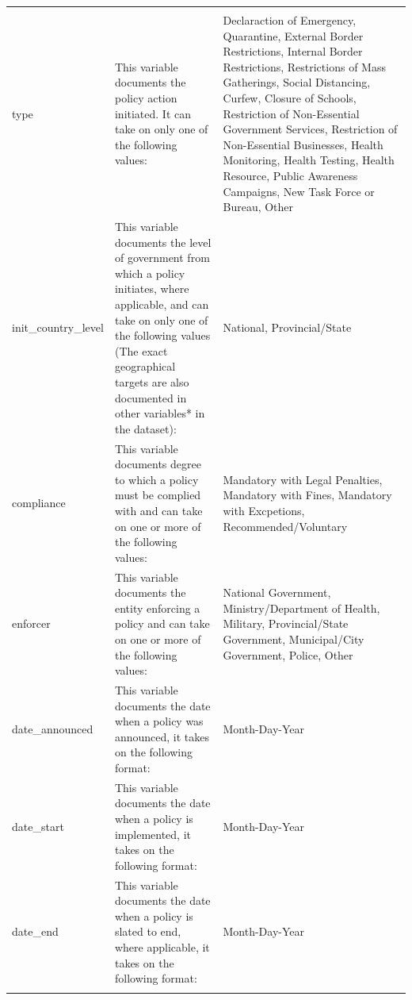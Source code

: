 \documentclass[]{article}
\begin{document}
\begin{ThreePartTable}
\begin{longtable}{>{\bfseries\raggedright\arraybackslash}p{3.5cm}>{\raggedright\arraybackslash}p{5cm}>{\raggedright\arraybackslash}p{8.5cm}}
\addlinespace[0.3em]
\multicolumn{3}{l}{\textbf{Monadic Variables}}\\
\hspace{1em}type & This variable documents the policy action initiated. It can take on only one of the following values: & Declaraction of Emergency, Quarantine, External Border Restrictions, Internal Border Restrictions, Restrictions of Mass Gatherings, Social Distancing, Curfew, Closure of Schools, Restriction of Non-Essential Government Services, Restriction of Non-Essential Businesses, Health Monitoring, Health Testing, Health Resource, Public Awareness Campaigns, New Task Force or Bureau, Other\\
\rowcolor{gray!6}  \hspace{1em}init\_country\_level & This variable documents the level of government from which a policy initiates, where applicable, and can take on only one of the following values  (The exact geographical targets are also documented in other variables* in the dataset): & National, Provincial/State\\
\hspace{1em}compliance & This variable documents degree to which a policy must be complied with and can take on one or more of the following values: & Mandatory with Legal Penalties, Mandatory with Fines, Mandatory with Excpetions, Recommended/Voluntary\\
\rowcolor{gray!6}  \hspace{1em}enforcer & This variable documents the entity enforcing a policy and can take on one or more of the following values: & National Government, Ministry/Department of Health, Military, Provincial/State Government, Municipal/City Government, Police, Other\\
\hspace{1em}date\_announced & This variable documents the date when a policy was announced, it takes on the following format: & Month-Day-Year\\
\rowcolor{gray!6}  \hspace{1em}date\_start & This variable documents the date when a policy is implemented, it takes on the following format: & Month-Day-Year\\
\hspace{1em}date\_end & This variable documents the date when a policy is slated to end, where applicable, it takes on the following format: & Month-Day-Year\\
\rowcolor{gray!6}  \addlinespace[0.3em]
\multicolumn{3}{l}{\textbf{Dyadic Variables}}\\

\end{longtable}
\end{ThreePartTable}
\end{document}
